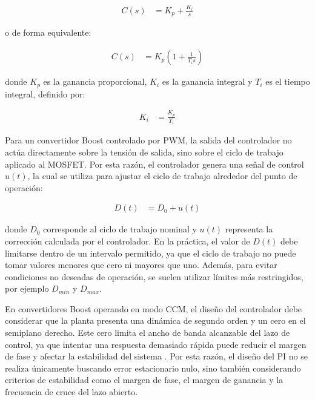 \documentclass[conference]{IEEEtran}
\begin{document}
\begin{equation}
\begin{aligned}
    C(s) &= K_p + \frac{K_i}{s}
\end{aligned}
\label{eq:controlador_pi_continuo}
\end{equation}

o de forma equivalente:

\begin{equation}
\begin{aligned}
    C(s) &= K_p \left(1 + \frac{1}{T_i s}\right)
\end{aligned}
\label{eq:controlador_pi_ti}
\end{equation}

donde $K_p$ es la ganancia proporcional, $K_i$ es la ganancia integral y $T_i$ es el tiempo integral, definido por:

\begin{equation}
\begin{aligned}
    K_i &= \frac{K_p}{T_i}
\end{aligned}
\label{eq:ki_ti}
\end{equation}

Para un convertidor Boost controlado por PWM, la salida del controlador no actúa directamente sobre la tensión de salida, sino sobre el ciclo de trabajo aplicado al MOSFET. Por esta razón, el controlador genera una señal de control $u(t)$, la cual se utiliza para ajustar el ciclo de trabajo alrededor del punto de operación:

\begin{equation}
\begin{aligned}
    D(t) &= D_0 + u(t)
\end{aligned}
\label{eq:duty_control_pi}
\end{equation}

donde $D_0$ corresponde al ciclo de trabajo nominal y $u(t)$ representa la corrección calculada por el controlador. En la práctica, el valor de $D(t)$ debe limitarse dentro de un intervalo permitido, ya que el ciclo de trabajo no puede tomar valores menores que cero ni mayores que uno. Además, para evitar condiciones no deseadas de operación, se suelen utilizar límites más restringidos, por ejemplo $D_{min}$ y $D_{max}$.

En convertidores Boost operando en modo CCM, el diseño del controlador debe considerar que la planta presenta una dinámica de segundo orden y un cero en el semiplano derecho. Este cero limita el ancho de banda alcanzable del lazo de control, ya que intentar una respuesta demasiado rápida puede reducir el margen de fase y afectar la estabilidad del sistema \cite{erickson2001fundamentals}. Por esta razón, el diseño del PI no se realiza únicamente buscando error estacionario nulo, sino también considerando criterios de estabilidad como el margen de fase, el margen de ganancia y la frecuencia de cruce del lazo abierto.
\end{document}
